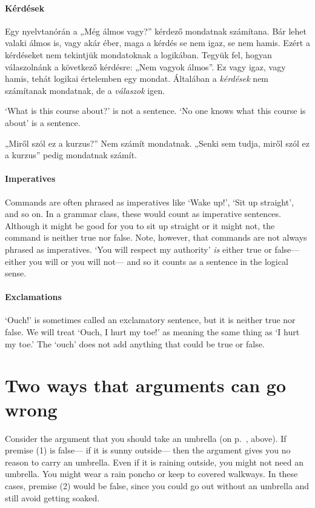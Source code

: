 \paragraph{Kérdések} Egy nyelvtanórán a „Még álmos vagy?” kérdező mondatnak számítana. Bár lehet valaki álmos is, vagy akár éber, maga a kérdés se nem igaz, se nem hamis. Ezért a kérdéseket nem tekintjük  mondatoknak  a logikában. Tegyük fel, hogyan válaszolnánk a következő kérdésre: „Nem vagyok álmos”. Ez vagy igaz, vagy hamis, tehát logikai értelemben egy mondat. Általában a \emph{kérdések} nem számítanak mondatnak, de a \emph{válaszok} igen.


`What is this course about?' is not a sentence. `No one knows what this course is about' is a sentence.



„Miről szól ez a kurzus?” Nem számít mondatnak. „Senki sem tudja, miről szól ez a kurzus” pedig mondatnak számít.




\paragraph{Imperatives} Commands are often phrased as imperatives like `Wake up!', `Sit up straight', and so on. In a grammar class, these would count as imperative sentences. Although it might be good for you to sit up straight or it might not, the command is neither true nor false. Note, however, that commands are not always phrased as imperatives. `You will respect my authority' \emph{is} either true or false--- either you will or you will not--- and so it counts as a sentence in the logical sense.

\paragraph{Exclamations} `Ouch!' is sometimes called an exclamatory sentence, but it is neither true nor false. We will treat `Ouch, I hurt my toe!' as meaning the same thing as `I hurt my toe.' The `ouch' does not add anything that could be true or false.




\section{Two ways that arguments can go wrong}
Consider the argument that you should take an umbrella (on p.~\pageref{argRaining}, above). If premise (1) is false--- if it is sunny outside--- then the argument gives you no reason to carry an umbrella. Even if it is raining outside, you might not need an umbrella. You might wear a rain poncho or keep to covered walkways. In these cases, premise (2) would be false, since you could go out without an umbrella and still avoid getting soaked.


